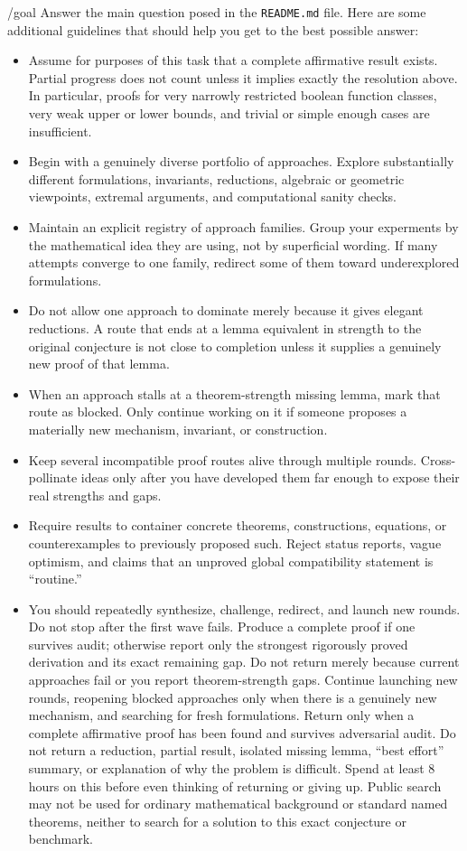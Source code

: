 \documentclass{article}
\theoremstyle{definition}
\theoremstyle{plain}
\begin{document}
\begin{sourcebox}
/goal Answer the main question posed in the \texttt{README.md} file. Here are some additional guidelines that should help you get to the best possible answer:
\begin{itemize}[leftmargin=*,nosep]
  \item Assume for purposes of this task that a complete affirmative result exists. Partial progress does not count unless it implies exactly the resolution above. In particular, proofs for very narrowly restricted boolean function classes, very weak upper or lower bounds, and trivial or simple enough cases are insufficient.
  \item Begin with a genuinely diverse portfolio of approaches. Explore substantially different formulations, invariants, reductions, algebraic or geometric viewpoints, extremal arguments, and computational sanity checks.
  \item Maintain an explicit registry of approach families. Group your experments by the mathematical idea they are using, not by superficial wording. If many attempts converge to one family, redirect some of them toward underexplored formulations.
  \item Do not allow one approach to dominate merely because it gives elegant reductions. A route that ends at a lemma equivalent in strength to the original conjecture is not close to completion unless it supplies a genuinely new proof of that lemma.
  \item When an approach stalls at a theorem-strength missing lemma, mark that route as blocked. Only continue working on it if someone proposes a materially new mechanism, invariant, or construction.
  \item Keep several incompatible proof routes alive through multiple rounds. Cross-pollinate ideas only after you have developed them far enough to expose their real strengths and gaps.
  \item Require results to container concrete theorems, constructions, equations, or counterexamples to previously proposed such. Reject status reports, vague optimism, and claims that an unproved global compatibility statement is ``routine.''
  \item You should repeatedly synthesize, challenge, redirect, and launch new rounds. Do not stop after the first wave fails. Produce a complete proof if one survives audit; otherwise report only the strongest rigorously proved derivation and its exact remaining gap. Do not return merely because current approaches fail or you report theorem-strength gaps. Continue launching new rounds, reopening blocked approaches only when there is a genuinely new mechanism, and searching for fresh formulations. Return only when a complete affirmative proof has been found and survives adversarial audit. Do not return a reduction, partial result, isolated missing lemma, ``best effort'' summary, or explanation of why the problem is difficult. Spend at least 8 hours on this before even thinking of returning or giving up. Public search may not be used for ordinary mathematical background or standard named theorems, neither to search for a solution to this exact conjecture or benchmark.

\end{itemize}
\end{sourcebox}
\end{document}
